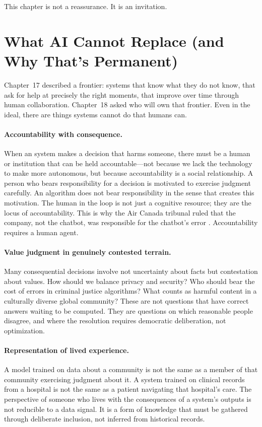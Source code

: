 This chapter is not a reassurance. It is an invitation.

\section{What AI Cannot Replace (and Why That's Permanent)}
\label{sec:ch19-what-ai-cannot-replace}

Chapter~17 described a frontier: \ai systems that know what they do not know, that ask for help at precisely the right moments, that improve over time through human collaboration. Chapter~18 asked who will own that frontier. Even in the ideal, there are things \ai systems cannot do that humans can.

\paragraph{Accountability with consequence.} When an \ai system makes a decision that harms someone, there must be a human or institution that can be held accountable---not because we lack the technology to make \ai more autonomous, but because accountability is a social relationship. A person who bears responsibility for a decision is motivated to exercise judgment carefully. An algorithm does not bear responsibility in the sense that creates this motivation. The human in the loop is not just a cognitive resource; they are the locus of accountability. This is why the Air Canada tribunal ruled that the company, not the chatbot, was responsible for the chatbot's error \autocite{moffatt2024}. Accountability requires a human agent.

\paragraph{Value judgment in genuinely contested terrain.} Many consequential decisions involve not uncertainty about facts but contestation about values. How should we balance privacy and security? Who should bear the cost of errors in criminal justice algorithms? What counts as harmful content in a culturally diverse global community? These are not questions that have correct answers waiting to be computed. They are questions on which reasonable people disagree, and where the resolution requires democratic deliberation, not optimization.

\paragraph{Representation of lived experience.} A model trained on data about a community is not the same as a member of that community exercising judgment about it. A system trained on clinical records from a hospital is not the same as a patient navigating that hospital's care. The perspective of someone who lives with the consequences of a system's outputs is not reducible to a data signal. It is a form of knowledge that must be gathered through deliberate inclusion, not inferred from historical records.

